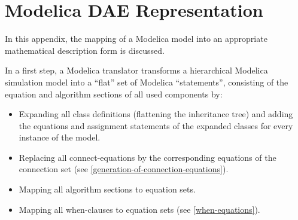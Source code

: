 \chapter{Modelica DAE Representation}

In this appendix, the mapping of a Modelica model into an appropriate
mathematical description form is discussed.

In a first step, a Modelica translator transforms a hierarchical
Modelica simulation model into a ``flat'' set of Modelica
``statements'', consisting of the equation and algorithm sections of all
used components by:
\begin{itemize}
\item
  Expanding all class definitions (flattening the inheritance tree) and
  adding the equations and assignment statements of the expanded classes
  for every instance of the model.
\item
  Replacing all connect-equations by the corresponding equations of the
  connection set (see \autoref{generation-of-connection-equations}).
\item
  Mapping all algorithm sections to equation sets.
\item
  Mapping all when-clauses to equation sets (see \autoref{when-equations}).
\end{itemize}

